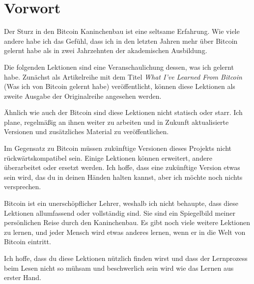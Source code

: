 \chapter*{Vorwort}
Der Sturz in den Bitcoin Kaninchenbau ist eine seltsame Erfahrung. Wie viele
andere habe ich das Gefühl, dass ich in den letzten Jahren mehr über Bitcoin
gelernt habe als in zwei Jahrzehnten der akademischen Ausbildung.

Die folgenden Lektionen sind eine Veranschaulichung dessen, was ich gelernt
habe. Zunächst als Artikelreihe mit dem Titel \textit{What I’ve Learned From
Bitcoin} (Was ich von Bitcoin gelernt habe) veröffentlicht, können diese
Lektionen als zweite Ausgabe der Originalreihe angesehen werden.

Ähnlich wie auch der Bitcoin sind diese Lektionen nicht statisch oder starr. Ich
plane, regelmäßig an ihnen weiter zu arbeiten und in Zukunft aktualisierte
Versionen und zusätzliches Material zu veröffentlichen.

Im Gegensatz zu Bitcoin müssen zukünftige Versionen dieses Projekts nicht
rückwärtskompatibel sein. Einige Lektionen können erweitert, andere überarbeitet
oder ersetzt werden. Ich hoffe, dass eine zukünftige Version etwas sein wird,
das du in deinen Händen halten kannst, aber ich möchte noch nichts versprechen.

Bitcoin ist ein unerschöpflicher Lehrer, weshalb ich nicht behaupte, dass diese
Lektionen allumfassend oder vollständig sind. Sie sind ein Spiegelbild meiner
persönlichen Reise durch den Kaninchenbau. Es gibt noch viele weitere Lektionen
zu lernen, und jeder Mensch wird etwas anderes lernen, wenn er in die Welt von
Bitcoin eintritt.

Ich hoffe, dass du diese Lektionen nützlich finden wirst und dass der
Lernprozess beim Lesen nicht so mühsam und beschwerlich sein wird wie das Lernen
aus erster Hand.

%
%
